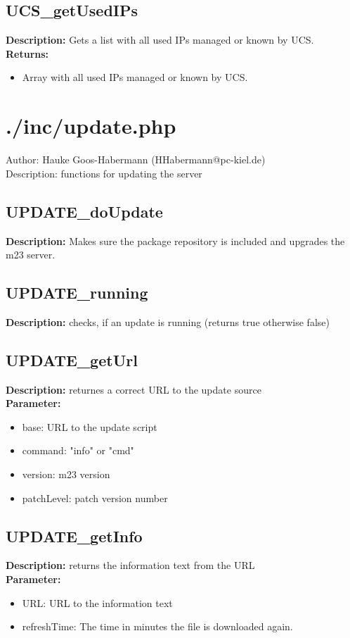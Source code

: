 \subsection{UCS\_getUsedIPs}
\textbf{Description:} Gets a list with all used IPs managed or known by UCS.\\
\textbf{Returns:}
\begin{itemize}
\item Array with all used IPs managed or known by UCS.
\end{itemize}

\newpage\section{./inc/update.php}
 Author: Hauke Goos-Habermann (HHabermann@pc-kiel.de)\\
 Description: functions for updating the server\\

\subsection{UPDATE\_doUpdate}
\textbf{Description:} Makes sure the package repository is included and upgrades the m23 server.\\

\subsection{UPDATE\_running}
\textbf{Description:} checks, if an update is running (returns true otherwise false)\\

\subsection{UPDATE\_getUrl}
\textbf{Description:} returnes a correct URL to the update source\\
\textbf{Parameter:}
\begin{itemize}
\item base: URL to the update script
\item command: "info" or "cmd"
\item version: m23 version
\item patchLevel: patch version number
\end{itemize}

\subsection{UPDATE\_getInfo}
\textbf{Description:} returns the information text from the URL\\
\textbf{Parameter:}
\begin{itemize}
\item URL: URL to the information text
\item refreshTime: The time in minutes the file is downloaded again.
\end{itemize}

